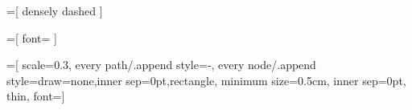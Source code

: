 \usepackage{tikz}


\newcommand{\tikzlabel}[2]{
    \ifdefined #1
        \renewcommand{#1}{#2}
    \else
        \newcommand{#1}{#2}
    \fi
}

\usepackage{etoolbox}
\makeatletter
\AtBeginDocument{%
  \patchcmd{\use@@tikzlibrary}{\global}{}{}{}%
}
\makeatother


%
%

\newcommand{\mydisable}{\tikzexternaldisable}
\newcommand{\myenable}{\tikzexternalenable}

\newcommand{\mytikzscale}{0.3}
\newcommand{\mytikzfigurewidth}{290pt} %
\newcommand{\mytikznodesize}{12.5pt}
\newcommand{\textnode}[1][]{\node[align=left,font=\mytikznormalfontsize,inner sep=0pt,rectangle,draw=none,#1]}
\newcommand{\terminalnode}[1][]{\node[rectangle,minimum size=0.4cm,solid,#1]}

\usepackage{currfile}
\providecommand{\mylabelprefix}{}
\newcommand{\mytikzfigurekey}{\mylabelprefix-\currfilename}

\newcommand{\mytikzfontsize}{\small}  %
\newcommand{\mytikzsmallfontsize}{\small}
\newcommand{\mytikznormalfontsize}{\normalsize}

=[
    densely dashed
]

=[
    font=\footnotesize
]



=[
    scale=\mytikzscale,
    every path/.append style={-},
    every node/.append style={draw=none,inner sep=0pt,rectangle},
    minimum size=0.5cm,
    inner sep=0pt,
    thin,
    font=\mytikznormalfontsize]

